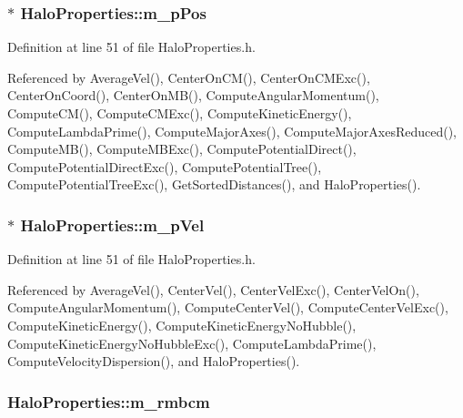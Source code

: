 \subsubsection[{m\_\-pPos}]{$\ast$ {\bf HaloProperties::m\_\-pPos}}\label{classHaloProperties_a5bf86b564f3d107d35065d71c80ebf1e}


Definition at line 51 of file HaloProperties.h.



Referenced by AverageVel(), CenterOnCM(), CenterOnCMExc(), CenterOnCoord(), CenterOnMB(), ComputeAngularMomentum(), ComputeCM(), ComputeCMExc(), ComputeKineticEnergy(), ComputeLambdaPrime(), ComputeMajorAxes(), ComputeMajorAxesReduced(), ComputeMB(), ComputeMBExc(), ComputePotentialDirect(), ComputePotentialDirectExc(), ComputePotentialTree(), ComputePotentialTreeExc(), GetSortedDistances(), and HaloProperties().

\subsubsection[{m\_\-pVel}]{ $\ast$ {\bf HaloProperties::m\_\-pVel}}\label{classHaloProperties_a87d16b6da2b2442e69e340623a002021}


Definition at line 51 of file HaloProperties.h.



Referenced by AverageVel(), CenterVel(), CenterVelExc(), CenterVelOn(), ComputeAngularMomentum(), ComputeCenterVel(), ComputeCenterVelExc(), ComputeKineticEnergy(), ComputeKineticEnergyNoHubble(), ComputeKineticEnergyNoHubbleExc(), ComputeLambdaPrime(), ComputeVelocityDispersion(), and HaloProperties().

\subsubsection[{m\_\-rmbcm}]{ {\bf HaloProperties::m\_\-rmbcm}}\label{classHaloProperties_a69b8eeefabab51e75c49e644e90e2eb6}


